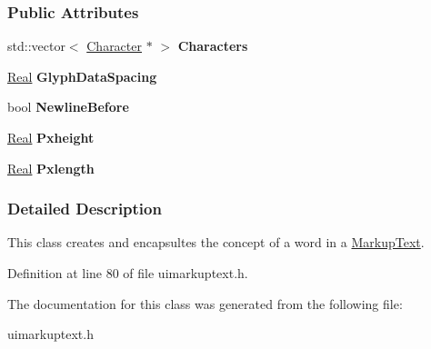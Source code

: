 \subsubsection*{Public Attributes}
\begin{DoxyCompactItemize}
\item 
\hypertarget{classMezzanine_1_1UI_1_1Word_a4e2c54e4ab7b4955490b58f9b134026c}{
std::vector$<$ \hyperlink{structMezzanine_1_1UI_1_1Character}{Character} $\ast$ $>$ {\bfseries Characters}}
\label{classMezzanine_1_1UI_1_1Word_a4e2c54e4ab7b4955490b58f9b134026c}

\item 
\hypertarget{classMezzanine_1_1UI_1_1Word_a528080f0abf6d36b3cd85666deea742c}{
\hyperlink{namespaceMezzanine_a726731b1a7df72bf3583e4a97282c6f6}{Real} {\bfseries GlyphDataSpacing}}
\label{classMezzanine_1_1UI_1_1Word_a528080f0abf6d36b3cd85666deea742c}

\item 
\hypertarget{classMezzanine_1_1UI_1_1Word_afce406ed84c1c79f671877b3c8fbd30c}{
bool {\bfseries NewlineBefore}}
\label{classMezzanine_1_1UI_1_1Word_afce406ed84c1c79f671877b3c8fbd30c}

\item 
\hypertarget{classMezzanine_1_1UI_1_1Word_afbdecab13791caf4c38085a4ba3acb45}{
\hyperlink{namespaceMezzanine_a726731b1a7df72bf3583e4a97282c6f6}{Real} {\bfseries Pxheight}}
\label{classMezzanine_1_1UI_1_1Word_afbdecab13791caf4c38085a4ba3acb45}

\item 
\hypertarget{classMezzanine_1_1UI_1_1Word_a9f268eba807f65108965d8081ccf2e4b}{
\hyperlink{namespaceMezzanine_a726731b1a7df72bf3583e4a97282c6f6}{Real} {\bfseries Pxlength}}
\label{classMezzanine_1_1UI_1_1Word_a9f268eba807f65108965d8081ccf2e4b}

\end{DoxyCompactItemize}


\subsubsection{Detailed Description}
This class creates and encapsultes the concept of a word in a \hyperlink{classMezzanine_1_1UI_1_1MarkupText}{MarkupText}. 

Definition at line 80 of file uimarkuptext.h.



The documentation for this class was generated from the following file:\begin{DoxyCompactItemize}
\item 
uimarkuptext.h\end{DoxyCompactItemize}
